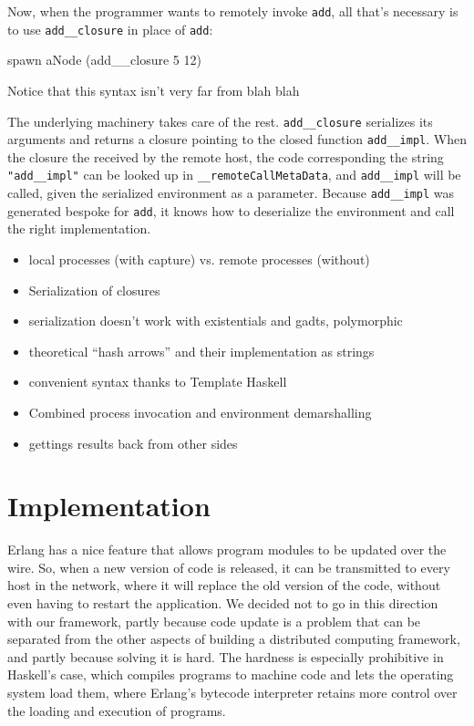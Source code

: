 \documentclass[preprint]{sigplanconf}
\begin{document}
Now, when the programmer wants to remotely invoke \texttt{add}, all that's necessary is to use \texttt{add\_\_closure} in place of \texttt{add}:

\begin{code}
spawn aNode (add__closure 5 12)
\end{code}

Notice that this syntax isn't very far from blah blah

The underlying machinery takes care of the rest. \texttt{add\_\_closure} serializes its arguments and returns a closure pointing to the closed function \texttt{add\_\_impl}. When the closure the received by the remote host, the code corresponding the string \texttt{"add\_\_impl"} can be looked up in \texttt{\_\_remoteCallMetaData}, and \texttt{add\_\_impl} will be called, given the serialized environment as a parameter. Because \texttt{add\_\_impl} was generated bespoke for \texttt{add}, it knows how to deserialize the environment and call the right implementation.

\begin{itemize}
\item local processes (with capture) vs. remote processes (without)
\item Serialization of closures
\item serialization doesn't work with existentials and gadts, polymorphic
\item theoretical ``hash arrows'' and their implementation as strings
\item convenient syntax thanks to Template Haskell
\item Combined process invocation and environment demarshalling
\item gettings results back from other sides
\end{itemize}


\section{Implementation}
Erlang has a nice feature that allows program modules to be updated over the wire. So, when a new version of code is released, it can be transmitted to every host in the network, where it will replace the old version of the code, without even having to restart the application. We decided not to go in this direction with our framework, partly because code update is a problem that can be separated from the other aspects of building a distributed computing framework, and partly because solving it is hard. The hardness is especially prohibitive in Haskell's case, which compiles programs to machine code and lets the operating system load them, where Erlang's bytecode interpreter retains more control over the loading and execution of programs.
\end{document}
